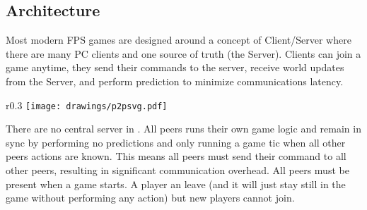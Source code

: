 \subsection{Architecture}
Most modern FPS games are designed around a concept of Client/Server where there are many PC clients and one source of truth (the Server). Clients can join a game anytime, they send their commands to the server, receive world updates from the Server, and perform prediction to minimize communications latency.\\
\par
\begin{wrapfigure}[8]{r}{0.3\textwidth}
\centering
\texttt{[image: drawings/p2psvg.pdf]}
\end{wrapfigure}
There are no central server in \doom. All peers runs their own game logic and remain in sync by performing no predictions and only running a game tic when all other peers actions are known. This means all peers must send their command to all other peers, resulting in significant communication overhead. 
All peers must be present when a game starts. A player an leave (and it will just stay still in the game without performing any action) but new players cannot join.
\pagebreak





